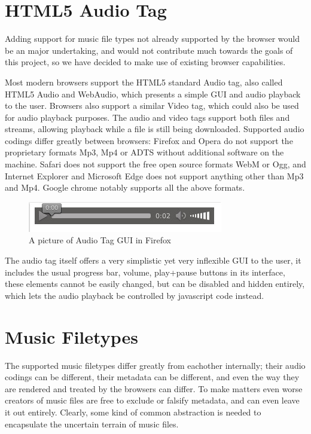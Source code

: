 \section{HTML5 Audio Tag}
Adding support for music file types not already supported by the browser 
would be an major undertaking, 
and would not contribute much towards the goals of this project, 
so we have decided to make use of existing browser capabilities.
\newline

Most modern browsers support the \acs{HTML}5 standard Audio tag,
also called \acs{HTML}5 Audio and WebAudio,
which presents a simple \acs{GUI} and audio playback to the user.
Browsers also support a similar Video tag, 
which could also be used for audio playback purposes.
The audio and video tags support both files and streams, 
allowing playback while a file is still being downloaded.
\newline
Supported audio codings differ greatly between browsers:
Firefox and Opera do not support the proprietary formats Mp3, Mp4 or ADTS
without additional software on the machine.
Safari does not support the free open source formats WebM or Ogg,
and Internet Explorer and Microsoft Edge does not support anything other than Mp3 and Mp4.
Google chrome notably supports all the above formats.
\newline

\begin{figure}[h]
  \centering
    \includegraphics[scale=0.5]{gfx/audioTag.jpg}
  \caption{A picture of Audio Tag GUI in Firefox}
  \label{fig:audiotag}
\end{figure}

The audio tag itself offers a very simplistic yet very inflexible \acs{GUI} to the user, 
it includes the usual progress bar, volume, play+pause buttons in its interface, 
these elements cannot be easily changed, but can be disabled and hidden entirely, 
which lets the audio playback be controlled by javascript code instead.
\newline

\section{Music Filetypes}
The supported music filetypes differ greatly from eachother internally; 
their audio codings can be different, their metadata can be different,
and even the way they are rendered and treated by the browsers can differ.
To make matters even worse creators of music files are free to exclude or falsify metadata, 
and can even leave it out entirely.
Clearly, some kind of common abstraction is needed to encapsulate the uncertain terrain of music files.
\newline

